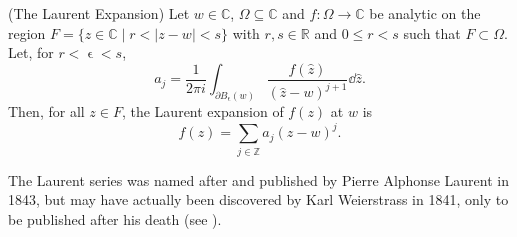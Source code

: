 \documentclass[a4paper]{article}
\begin{document}
\begin{theorem}{(The Laurent Expansion) \citep[p.222]{Marsden}}{} \label{thm:laurentexists} 
Let $w \in \mathbb{C}$, $\Omega \subseteq \mathbb{C}$ and $f: \Omega \rightarrow \mathbb{C}$ be analytic on the region $F = \{z \in \mathbb{C} \mid r < |z-w|< s\} $ with $r,s \in \mathbb{R}$ and $0\leq r<s$ such that $F \subset \Omega$. Let, for $r< \upvarepsilon <s$,
\[a_{j} = \frac{1}{2\pi i }\int_{\partial B_{\upvarepsilon}(w)} { \frac{f(\hat{z})}{(\hat{z}-w)^{j+1}} \dd \hat{z}}.\]
Then, for all $z \in F$, the Laurent expansion of $f(z)$ at $w$ is
\[f(z) = \sum_{j \in \mathbb{Z}} a_{j}(z-w)^{j}.\]
\end{theorem}

The Laurent series was named after and published by Pierre Alphonse Laurent in 1843, but may have actually been discovered by Karl Weierstrass in 1841, only to be published after his death (see \citep[p.12]{Spirit}). 
\end{document}
